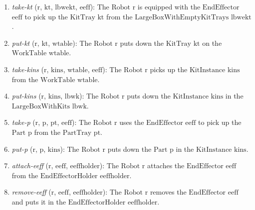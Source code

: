 \documentclass[a4paper, 10pt, conference]{ieeeconf}      %
\begin{document}
\begin{enumerate}
\item \textsl{take-kt} ($\mathrm{r}$, $\mathrm{kt}$, $\mathrm{lbwekt}$, $\mathrm{eeff}$): The $\mathrm{Robot}$ $\mathrm{r}$ is equipped with the $\mathrm{EndEffector}$ $\mathrm{eeff}$ to pick up the $\mathrm{KitTray}$ $\mathrm{kt}$ from the $\mathrm{LargeBoxWithEmptyKitTrays}$ $\mathrm{lbwekt}$.

\item \textsl{put-kt} ($\mathrm{r}$, $\mathrm{kt}$, $\mathrm{wtable}$): The $\mathrm{Robot}$ $\mathrm{r}$ puts down the $\mathrm{KitTray}$ $\mathrm{kt}$ on the $\mathrm{WorkTable}$ $\mathrm{wtable}$.

\item \textsl{take-kins} ($\mathrm{r}$, $\mathrm{kins}$, $\mathrm{wtable}$, $\mathrm{eeff}$): The $\mathrm{Robot}$ $\mathrm{r}$ picks up the $\mathrm{KitInstance}$ $\mathrm{kins}$ from the $\mathrm{WorkTable}$ $\mathrm{wtable}$.

\item \textsl{put-kins} ($\mathrm{r}$, $\mathrm{kins}$, $\mathrm{lbwk}$): The $\mathrm{Robot}$ $\mathrm{r}$ puts down the $\mathrm{KitInstance}$ $\mathrm{kins}$ in the $\mathrm{LargeBoxWithKits}$ $\mathrm{lbwk}$.

\item \textsl{take-p} ($\mathrm{r}$, $\mathrm{p}$, $\mathrm{pt}$, $\mathrm{eeff}$): The $\mathrm{Robot}$ $\mathrm{r}$ uses the $\mathrm{EndEffector}$ $\mathrm{eeff}$ to pick up the $\mathrm{Part}$ $\mathrm{p}$ from the $\mathrm{PartTray}$ $\mathrm{pt}$.

\item \textsl{put-p} ($\mathrm{r}$, $\mathrm{p}$, $\mathrm{kins}$): The $\mathrm{Robot}$ $\mathrm{r}$ puts down the $\mathrm{Part}$ $\mathrm{p}$ in the $\mathrm{KitInstance}$ $\mathrm{kins}$.

\item \textsl{attach-eeff} ($\mathrm{r}$, $\mathrm{eeff}$, $\mathrm{eeffholder}$): The $\mathrm{Robot}$ $\mathrm{r}$ attaches the $\mathrm{EndEffector}$ $\mathrm{eeff}$ from the $\mathrm{EndEffectorHolder}$ $\mathrm{eeffholder}$.

\item \textsl{remove-eeff} ($\mathrm{r}$, $\mathrm{eeff}$, $\mathrm{eeffholder}$): The $\mathrm{Robot}$ $\mathrm{r}$ removes the $\mathrm{EndEffector}$ $\mathrm{eeff}$ and puts it in the $\mathrm{EndEffectorHolder}$ $\mathrm{eeffholder}$.
\end{enumerate}
\end{document}

